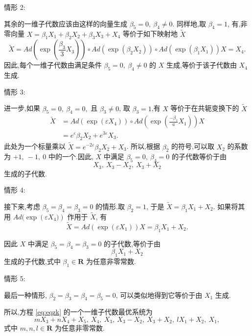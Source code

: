 情形 2:

其余的一维子代数应该由这样的向量生成 $\beta_5=0, ~\beta_4\neq 0$. 同样地,取 $\beta_4=1$, 有,非零向量 $X=\beta_{1}X_{1}+\beta_{2}X_{2}+\beta_{3}X_{3}+X_{4}$ 等价于如下映射地 $\widetilde{X}$
\begin{equation*}
	\widetilde{X}= Ad(\exp{(\frac{\beta_3}{3} X_3)})\circ Ad(\exp{(\beta_2 X_2)})\circ Ad(\exp{(\beta_1 X_1)}) X=X_{4}.
\end{equation*}
因此,每个一维子代数由满足条件 $\beta_5=0,~ \beta_4\neq 0$ 的 $X$ 生成,等价于该子代数由 $X_{4}$ 生成.

情形 3:

进一步,如果 $\beta_5=0,~\beta_4=0,$ 且 $\beta_3\neq 0$, 取 $\beta_3=1$,有 $X$ 等价于在共轭变换下的 $\widetilde{X}$
\begin{equation*}
\begin{aligned}
\widetilde{X}&=Ad(\exp(\varepsilon X_{4}))\circ Ad(\exp{(\frac{-\beta_1}{a} X_1)}) X\\
&=e^{\varepsilon}\beta_{2}X_{2}+e^{3\varepsilon}X_{3}.
\end{aligned}
\end{equation*}
此处为一个标量乘以 $\widetilde{X}=e^{-2\varepsilon}\beta_{2}X_{2}+X_{3}$. 所以,根据 $\beta_{2}$ 的符号,可以取 $X_{2}$ 的系数为 $+1,~-1,~0$ 中的一个.因此, $X$ 中满足 $\beta_5=0,~\beta_4=0$ 的子代数等价于由
\begin{equation*}
	X_{3}, ~X_{3}-X_{2}, ~X_{3}+X_{2}
\end{equation*}
生成的子代数.

情形 4:

接下来,考虑 $\beta_5=\beta_4=\beta_3=0$ 的情形.取 $\beta_2=1$, 于是 $\widetilde{X}=\beta_{1}X_{1}+X_{2}$. 如果将其用 $Ad(\exp({\varepsilon X_4)})$ 作用于 $\widetilde{X}$, 有
\begin{equation*}
	\widetilde{X}=Ad(\exp{(\varepsilon X_1)}) X=\beta_{1}X_{1}+X_{2}.
\end{equation*}

因此 $X$ 中满足 $\beta_5=\beta_4=\beta_3=0$ 的子代数,等价于由
\begin{equation*}
	\beta_{1}X_{1}+X_{2}
\end{equation*}
生成的子代数,式中 $\beta_{1} \in \mathbf{R}$ 为任意非零常数.

情形 5:

最后一种情形, $\beta_{2}=\beta_{3}=\beta_{4}=\beta_{5}=0$, 可以类似地得到它等价于由 $X_1$ 生成.

所以,方程 \eqref{eq:eqzk} 的一个一维子代数最优系统为
\begin{equation*}
	mX_{3}+nX_{4}+X_{5}, ~X_{4},~ X_{3}, ~X_{3}-X_{2},~ X_{3}+X_{2},~ lX_{1}+X_{2}, ~X_{1},
\end{equation*}
式中 $m,n,l\in \mathbf{R}$ 为任意非零常数.

